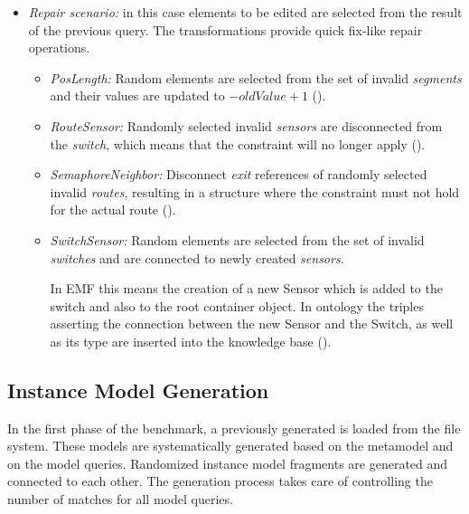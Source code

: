 \begin{itemize}
  \item \emph{Repair scenario:} in this case elements to be edited are selected from the result of the previous query. The transformations provide quick fix-like repair operations.
  \begin{itemize}
    
    \item \emph{PosLength:} Random elements are selected from the set of invalid \emph{segments} and their values are updated to $- \mathit{oldValue} + 1$ ().
    
    \item \emph{RouteSensor:} Randomly selected invalid \emph{sensors} are disconnected from the \emph{switch}, which means that the constraint will no longer apply ().
    
    \item  \emph{SemaphoreNeighbor:} Disconnect \emph{exit} references of randomly selected invalid \emph{routes}, resulting in a structure where the constraint must not hold for the actual route ().
        
    \item \emph{SwitchSensor:} Random elements are selected from the set of invalid \emph{switches} and are connected to newly created \emph{sensors}.
    
    In EMF this means the creation of a new Sensor which is added to the switch and also to the root container object. In ontology the triples asserting the connection between the new Sensor and the Switch, as well as its type are inserted into the knowledge base ().
    
  \end{itemize}
\end{itemize}


\subsection{Instance Model Generation}
\label{sec:instanceGeneration}

In the first phase of the benchmark, a previously generated  is loaded from the file system. These models are systematically generated based on the metamodel and on the model queries. Randomized instance model fragments are generated and connected to each other. The generation process takes care of controlling the number of matches for all model queries.

